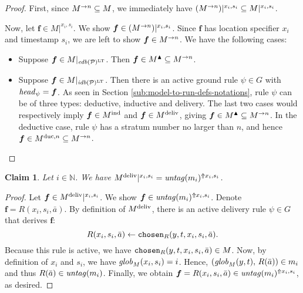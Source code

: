 \documentclass{tlp}
\newtheorem{claim}[theorem]{Claim}
\newcommand{\Nat}{\mathbb{N}}  \newcommand{\len}[1]{|#1|} \newcommand{\rom}[1]{\text{\emph{(#1)}}} \newcommand{\romI}{\rom i}
\newcommand{\ded}{\mathcal{P}}
\newcommand{\fc}{\boldsymbol{f}}
\newcommand{\proj}[2]{#1|_{#2}}
\newcommand{\head}[1]{\fname{head}_{#1}}
\newcommand{\idb}[1]{\fname{idb}(#1)}
\newcommand{\edb}[1]{\fname{edb}(#1)}
\newcommand{\grl}{\psi}
\newcommand{\sh}[1]{(#1)}
\newcommand{\toloct}[1]{#1^{\mathrm{LT}}}
\newcommand{\addlt}[3]{#1^{\Uparrow#2,#3}}
\newcommand{\projlt}[3]{#1|^{#2,#3}}
\newcommand{\shprojlt}[3]{\projlt{\sh{#1}}{#2}{#3}}
\newcommand{\chosen}{\pred{chosen}}
\newcommand{\pair}[2]{(#1,#2)}
\newcommand{\untag}[1]{\fname{untag}(#1)}
\newcommand{\grded}{G}
\newcommand{\globM}[1]{\fname{glob}_{M}(#1)}
\begin{document}
\begin{appendix}
\begin{proof}

First, since $M^{\to n}\subseteq M$, we immediately have $\shprojlt{\strat Mn}{x_{i}}{s_{i}}\subseteq\projlt M{x_{i}}{s_{i}}$. 

Now, let $\fc\in\projlt M{x_{i}}{s_{i}}$. We show $\fc\in\shprojlt{\strat Mn}{x_{i}}{s_{i}}$.
Since $\fc$ has location specifier $x_{i}$ and timestamp $s_{i}$,
we are left to show $\fc\in\strat Mn$. We have the following cases:
\begin{itemize}
\item Suppose $\fc\in\proj M{\toloct{\edb{\ded}}}$. Then $\fc\in\up M\subseteq\strat Mn$.
\item Suppose $\fc\in\proj M{\toloct{\idb{\ded}}}$. Then there is an active
ground rule $\grl\in\grded$ with $\head{\grl}=\fc$. As seen in Section
\ref{sub:model-to-run-defs-notations}, rule $\grl$ can be of three
types: deductive, inductive and delivery. The last two cases would
respectively imply $\fc\in\ind M$ and $\fc\in\deliv M$, giving $\fc\in\up M\subseteq\strat Mn$.
In the deductive case, rule $\grl$ has a stratum number no larger
than $n$, and hence $\fc\in\duc Mn\subseteq\strat Mn$.
\end{itemize}
\end{proof}



\tline



\begin{claim}\label{claim:deliv-is-untag}Let $i\in\Nat$. We have
$\projlt{\deliv M}{x_{i}}{s_{i}}=\addlt{\untag{m_{i}}}{x_{i}}{s_{i}}$.
\end{claim}

\begin{proof}

Let $\fc\in\projlt{\deliv M}{x_{i}}{s_{i}}$. We show $\fc\in\addlt{\untag{m_{i}}}{x_{i}}{s_{i}}$.
Denote $\fc=R(x_{i},s_{i},\bar{a})$. By definition of $M^{\mathrm{deliv}}$,
there is an active delivery rule $\grl\in\grded$ that derives $\fc$:
\[
R(x_{i},s_{i},\bar{a})\gets\chosen_{R}(y,t,x_{i},s_{i},\bar{a}).
\]
Because this rule is active, we have $\chosen_{R}(y,t,x_{i},s_{i},\bar{a})\in M$.
Now, by definition of $x_{i}$ and $s_{i}$, we have $\globM{x_{i},s_{i}}=i$.
Hence, $\pair{\globM{y,t}}{\, R(\bar{a})}\in m_{i}$ and thus $R(\bar{a})\in\untag{m_{i}}$.
Finally, we obtain $\fc=R(x_{i},s_{i},\bar{a})\in\addlt{\untag{m_{i}}}{x_{i}}{s_{i}}$,
as desired.




\end{proof}
\end{appendix}
\end{document}
